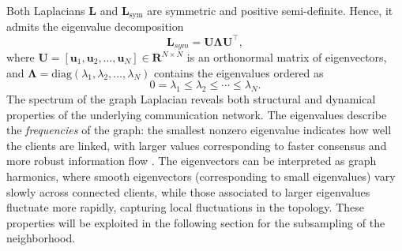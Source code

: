 \documentclass[journal]{IEEEtran}
\begin{document}
Both Laplacians $\mathbf{L}$ and $\mathbf{L}_{\text{sym}}$ are symmetric and positive semi-definite. 
Hence, it admits the eigenvalue decomposition
\begin{equation}    
\mathbf{L}_{sym} = \mathbf{U} \mathbf{\Lambda} \mathbf{U}^\top,
\end{equation}
where $\mathbf{U} = [\mathbf{u}_1, \mathbf{u}_2, \dots, \mathbf{u}_N] \in \mathbf{R}^{N \times N}$ is an orthonormal matrix of eigenvectors, 
and $\mathbf{\Lambda} = \mathrm{diag}(\lambda_1, \lambda_2, \dots, \lambda_N)$ contains the eigenvalues 
ordered as
\begin{equation}
0 = \lambda_1 \leq \lambda_2 \leq \cdots \leq \lambda_N.
\end{equation}
The spectrum of the graph Laplacian reveals both structural and dynamical properties of the underlying communication network. The eigenvalues describe the \textit{frequencies} of the graph: the smallest nonzero eigenvalue indicates how well the clients are linked, with larger values corresponding to faster consensus and more robust information flow \cite{graph_theory}. The eigenvectors can be interpreted as graph harmonics, where smooth eigenvectors (corresponding to small eigenvalues) vary slowly across connected clients, while those associated to larger eigenvalues fluctuate more rapidly, capturing local fluctuations in the topology. These properties will be exploited in the following section for the subsampling of the neighborhood.
\vspace{-0.4 cm}
\end{document}
